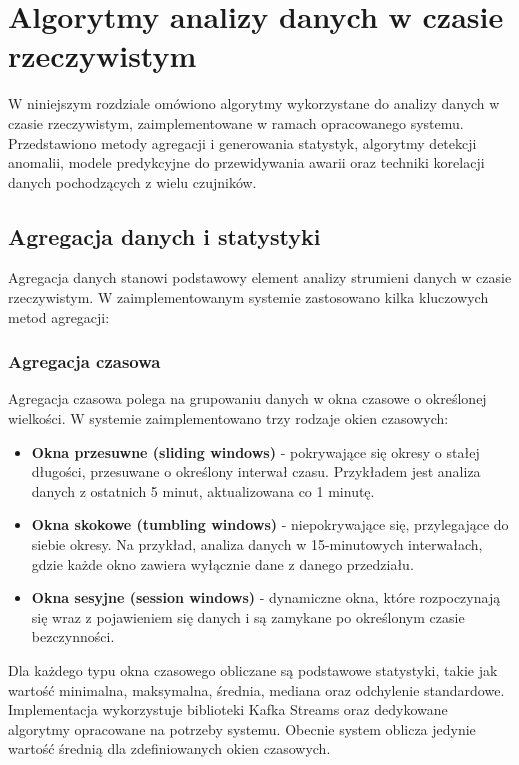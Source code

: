 \section{Algorytmy analizy danych w czasie rzeczywistym}
\label{sec:algorytmy_analizy}

W niniejszym rozdziale omówiono algorytmy wykorzystane do analizy danych w czasie rzeczywistym, zaimplementowane w ramach opracowanego systemu. Przedstawiono metody agregacji i generowania statystyk, algorytmy detekcji anomalii, modele predykcyjne do przewidywania awarii oraz techniki korelacji danych pochodzących z wielu czujników.

\subsection{Agregacja danych i statystyki}
\label{subsec:agregacja_statystyki}

Agregacja danych stanowi podstawowy element analizy strumieni danych w czasie rzeczywistym. W zaimplementowanym systemie zastosowano kilka kluczowych metod agregacji:

\subsubsection{Agregacja czasowa}
\label{subsubsec:agregacja_czasowa}

Agregacja czasowa polega na grupowaniu danych w okna czasowe o określonej wielkości. W systemie zaimplementowano trzy rodzaje okien czasowych:

\begin{itemize}
    \item \textbf{Okna przesuwne (sliding windows)} - pokrywające się okresy o stałej długości, przesuwane o określony interwał czasu. Przykładem jest analiza danych z ostatnich 5 minut, aktualizowana co 1 minutę.
    \item \textbf{Okna skokowe (tumbling windows)} - niepokrywające się, przylegające do siebie okresy. Na przykład, analiza danych w 15-minutowych interwałach, gdzie każde okno zawiera wyłącznie dane z danego przedziału.
    \item \textbf{Okna sesyjne (session windows)} - dynamiczne okna, które rozpoczynają się wraz z pojawieniem się danych i są zamykane po określonym czasie bezczynności.
\end{itemize}

Dla każdego typu okna czasowego obliczane są podstawowe statystyki, takie jak wartość minimalna, maksymalna, średnia, mediana oraz odchylenie standardowe. Implementacja wykorzystuje biblioteki Kafka Streams oraz dedykowane algorytmy opracowane na potrzeby systemu. Obecnie system oblicza jedynie wartość średnią dla zdefiniowanych okien czasowych.

